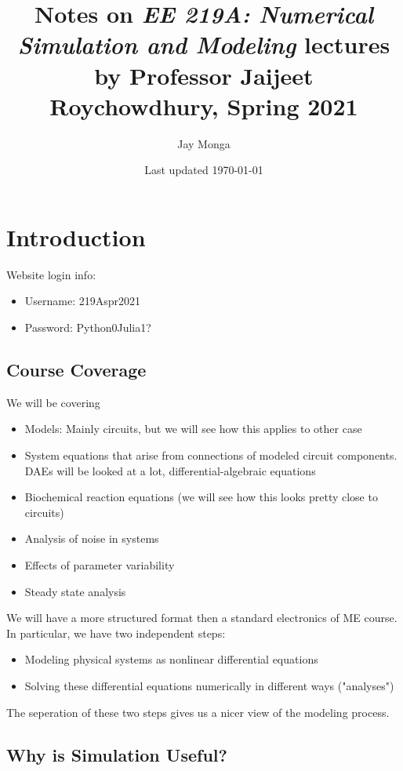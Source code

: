 \documentclass{report}
\begin{document}
\title{Notes on \textit{EE 219A: Numerical Simulation and Modeling} lectures by Professor Jaijeet Roychowdhury, Spring 2021}
\author{Jay Monga}
\date{Last updated \today}
\maketitle

\tableofcontents

\chapter{Introduction}
Website login info:
\begin{itemize}
    \item Username: 219Aspr2021
    \item Password: Python0Julia1?
\end{itemize}

\section{Course Coverage}
We will be covering
\begin{itemize}
    \item Models: Mainly circuits, but we will see how this applies to other case
    \item System equations that arise from connections of modeled circuit components. DAEs will be looked at a lot, differential-algebraic equations
    \item Biochemical reaction equations (we will see how this looks pretty close to circuits)
    \item Analysis of noise in systems
    \item Effects of parameter variability
    \item Steady state analysis
\end{itemize}
We will have a more structured format then a standard electronics of ME course. In particular, we have two independent steps:
\begin{itemize}
    \item Modeling physical systems as nonlinear differential equations
    \item Solving these differential equations numerically in different ways ("analyses")
\end{itemize}
The seperation of these two steps gives us a nicer view of the modeling process.
\section{Why is Simulation Useful?}
\end{document}
